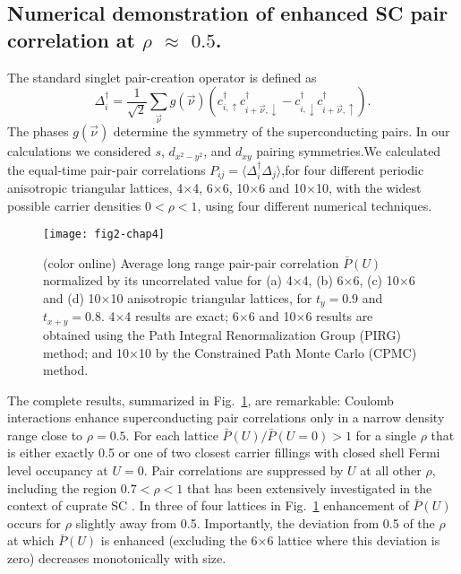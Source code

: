 \documentclass[a4paper,12pt]{article}
\begin{document}
\subsection{Numerical demonstration of enhanced SC pair correlation at $\rho$ $\approx$ $0.5$.}
The standard singlet pair-creation operator is defined as 
\begin{equation}
\Delta^\dagger_i= \frac{1}{\sqrt{2}}\sum_{\vec{\nu}} g(\vec{\nu}) 
(c^\dagger_{i,\uparrow}c^\dagger_{i+{\vec{\nu}},\downarrow}
- c^\dagger_{i,\downarrow}c^\dagger_{i+{\vec{\nu}},\uparrow}).
\label{pair}
\end{equation}
The phases $g(\vec{\nu})$ determine the symmetry of the superconducting pairs. In our calculations we considered $s$, $d_{x^2-y^2}$, and
$d_{xy}$ pairing symmetries.We calculated \cite{ngomes16} the equal-time pair-pair correlations  $P_{ij}=\langle \Delta^\dagger_i
\Delta_j\rangle$,for four different periodic anisotropic triangular lattices, 4$\times$4, 6$\times$6, 10$\times$6 and 10$\times$10, with
the widest possible carrier densities $0 < \rho <1$, using four different numerical techniques. 
\begin{figure}[h]
\centerline{\texttt{[image: fig2-chap4]}}
  \caption{(color online) Average long range pair-pair correlation
    $\bar{P}(U)$ normalized by its uncorrelated value for (a)
    4$\times$4, (b) 6$\times$6, (c) 10$\times$6 and (d) 10$\times$10
    anisotropic triangular lattices, for $t_y=0.9$ and $t_{x+y}=0.8$.
    4$\times$4 results are exact; 6$\times$6 and 10$\times$6 results
    are obtained using the Path Integral Renormalization Group (PIRG)
    method; and 10$\times$10 by the Constrained Path Monte Carlo
    (CPMC) method.}
\label{pairing-fig}
\end{figure}
The complete results, summarized in Fig.~\ref{pairing-fig}, are remarkable:
Coulomb interactions enhance superconducting pair correlations only in a narrow density range close to $\rho=0.5$. For each lattice
$\bar{P}(U)/\bar{P}(U=0)>1$ for a single $\rho$ that is either exactly 0.5 or one of two closest carrier fillings with closed shell Fermi
level occupancy at $U=0$.  Pair correlations are suppressed by $U$ at all other $\rho$, including the region $0.7<\rho<1$ that has been
extensively investigated in the context of cuprate SC \cite{scalapino12a}.  In three of four lattices in
Fig.~\ref{pairing-fig} enhancement of $\bar{P}(U)$ occurs for $\rho$ slightly away from 0.5. Importantly, the deviation from 0.5 of
the $\rho$ at which $\bar{P}(U)$ is enhanced (excluding the 6$\times$6 lattice where this deviation is zero) decreases monotonically with
size.
\end{document}
